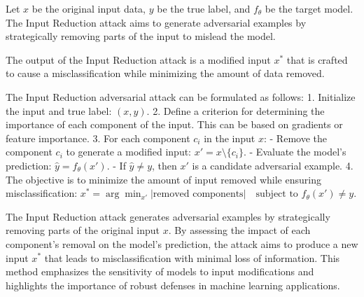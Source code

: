 Let \( x \) be the original input data, \( y \) be the true label, and \( f_{\theta} \) be the target model. The Input Reduction attack aims to generate adversarial examples by strategically removing parts of the input to mislead the model.

The output of the Input Reduction attack is a modified input \( x^* \) that is crafted to cause a misclassification while minimizing the amount of data removed.

The Input Reduction adversarial attack can be formulated as follows:
1. Initialize the input and true label:
   $
   (x, y).
   $
2. Define a criterion for determining the importance of each component of the input. This can be based on gradients or feature importance.
3. For each component \( c_i \) in the input \( x \):
   - Remove the component \( c_i \) to generate a modified input:
   $
   x' = x \setminus \{c_i\}.
   $
   - Evaluate the model's prediction:
   $
   \hat{y} = f_{\theta}(x').
   $
   - If \( \hat{y} \neq y \), then \( x' \) is a candidate adversarial example.
4. The objective is to minimize the amount of input removed while ensuring misclassification:
   $
   x^* = \arg\min_{x'} |\text{removed components}| \quad \text{subject to } f_{\theta}(x') \neq y.
   $

The Input Reduction attack generates adversarial examples by strategically removing parts of the original input \( x \). By assessing the impact of each component's removal on the model's prediction, the attack aims to produce a new input \( x^* \) that leads to misclassification with minimal loss of information. This method emphasizes the sensitivity of models to input modifications and highlights the importance of robust defenses in machine learning applications.
